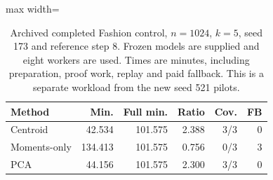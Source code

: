 \begin{table}[tbp]
\centering
\small
\caption{Archived completed Fashion control, $n=1024$, $k=5$, seed 173 and reference step 8. Frozen models are supplied and eight workers are used. Times are minutes, including preparation, proof work, replay and paid fallback. This is a separate workload from the new seed 521 pilots.}
\label{tab:ccd-archive}
\begin{adjustbox}{max width=\columnwidth}
\begin{tabular}{lrrrrr}
\toprule
Method & Min. & Full min. & Ratio & Cov. & FB\\
\midrule
Centroid & 42.534 & 101.575 & 2.388 & 3/3 & 0\\
Moments-only & 134.413 & 101.575 & 0.756 & 0/3 & 3\\
PCA & 44.156 & 101.575 & 2.300 & 3/3 & 0\\
\bottomrule
\end{tabular}
\end{adjustbox}
\end{table}
